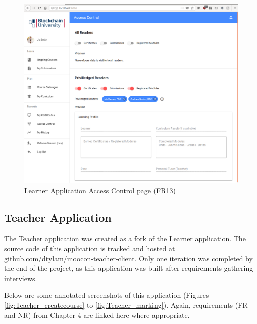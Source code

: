 \begin{figure}[!ht]
	\centering
	\includegraphics[width=1.05\textwidth]{Learner_AC}
	\caption[Learner Application Access Control page]
	{Learner Application Access Control page (FR13)}
	\label{fig:Learner_AC}
\end{figure}

\clearpage
\subsection{Teacher Application}

The Teacher application was created as a fork of the Learner application. 
The source code of this application is tracked and hosted at 
\href{https://github.com/dtylam/moocon-teacher-client}{\underline{github.com/dtylam/moocon-teacher-client}}.
Only one iteration was completed by the end of the project, as this application was built after requirements gathering interviews.

Below are some annotated screenshots of this application (Figures \ref{fig:Teacher_createcourse} to 
\ref{fig:Teacher_marking}). Again, requirements (FR and NR) from Chapter 4 are linked here where appropriate.

